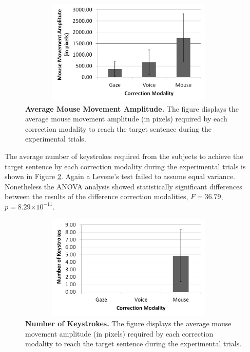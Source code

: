 \documentclass[]{article}
\providecommand{\e}[1]{\ensuremath{\times 10^{#1}}}
\begin{document}
\begin{figure}[ht]
\begin{center}
\vspace{-3mm}
\includegraphics[width=0.95\textwidth,height=50mm]{figures/mouseDisplacement.png}
\end{center}
\caption{\textbf{Average Mouse Movement Amplitude.} The figure displays the average mouse movement amplitude (in pixels)
required by each correction modality to reach the target sentence during the experimental trials.}
\label{mouseDisplacement}
\end{figure}

The average number of keystrokes required from the subjects to achieve the target sentence by each correction modality
during the experimental trials is shown in Figure \ref{keystrokes}. Again a Levene's test failed to assume equal
variance. Nonetheless the ANOVA analysis showed statistically significant differences between the results of the
difference correction modalities, $F=36.79$, $p=8.29\e{-11}$. 

\begin{figure}[ht]
\begin{center}
\vspace{-3mm}
\includegraphics[width=0.95\textwidth,height=50mm]{figures/keystrokes.png}
\end{center}
\caption{\textbf{Number of Keystrokes.} The figure displays the average mouse movement amplitude (in pixels)
required by each correction modality to reach the target sentence during the experimental trials.}
\label{keystrokes}
\end{figure}
\end{document}
